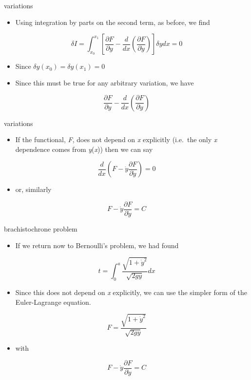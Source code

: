 \documentclass[12pt,handout]{beamer}
\providecommand{\tightlist}{%
  \setlength{\itemsep}{0pt}\setlength{\parskip}{0pt}}
\providecommand{\tightlist}{%
\setlength{\itemsep}{0pt}\setlength{\parskip}{0pt}}
\begin{document}
\begin{frame}{variations}
\protect\hypertarget{variations-5}{}
\begin{itemize}
\tightlist
\item
  Using integration by parts on the second term, as before, we find
\end{itemize}

\[\delta I = \int_{x_0}^{x_1} \left[  \frac{\partial F}{\partial y} - \frac{d}{dx}\left(\frac{\partial F}{\partial \dot{y}}\right) \right]\delta y dx = 0\]

\begin{itemize}
\tightlist
\item
  Since \(\delta y (x_0) = \delta y (x_1) = 0\)
\item
  Since this must be true for any arbitrary variation, we have
\end{itemize}

\[\frac{\partial F}{\partial y} - \frac{d}{dx}\left(\frac{\partial F}{\partial \dot{y}}\right)\]
\end{frame}

\begin{frame}{variations}
\protect\hypertarget{variations-6}{}
\begin{itemize}
\tightlist
\item
  If the functional, \emph{F}, does not depend on \emph{x} explicitly
  (i.e.~the only \emph{x} dependence comes from \emph{y}(\emph{x})) then
  we can say
\end{itemize}

\[\frac{d}{dx}\left( F - \dot{y} \frac{\partial F}{\partial \dot{y}}\right) = 0\]

\begin{itemize}
\tightlist
\item
  or, similarly
\end{itemize}

\[F - \dot{y} \frac{\partial F}{\partial \dot{y}} = C\]
\end{frame}

\begin{frame}{brachistochrone problem}
\protect\hypertarget{brachistochrone-problem}{}
\begin{itemize}
\tightlist
\item
  If we return now to Bernoulli's problem, we had found
\end{itemize}

\[t = \int_0^a \frac{\sqrt{1 + \dot{y}^2}}{\sqrt{2 g y}}dx\]

\begin{itemize}
\tightlist
\item
  Since this does not depend on \emph{x} explicitly, we can use the
  simpler form of the Euler-Lagrange equation.
\end{itemize}

\[F = \frac{\sqrt{1 + \dot{y}^2}}{\sqrt{2 g y}}\]

\begin{itemize}
\tightlist
\item
  with
\end{itemize}

\[F - \dot{y} \frac{\partial F}{\partial \dot{y}} = C\]
\end{frame}
\end{document}
